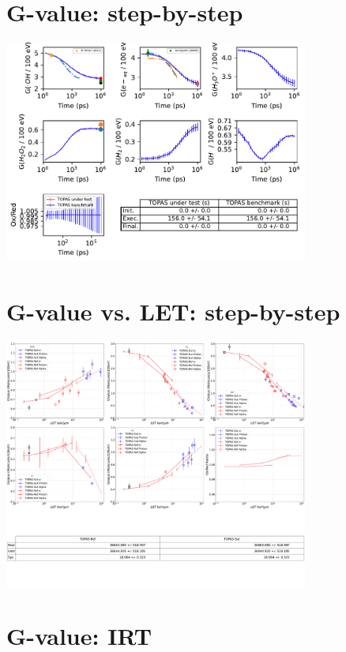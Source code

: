 \documentclass[aspectratio=1610]{beamer}
\begin{document}
\section{G-value: step-by-step}

\begin{frame}{\secname}
 \centering
   \includegraphics[width=0.75\textwidth]{./GvalueStepByStep/Gvalue}
\end{frame}

\section{G-value vs. LET: step-by-step}

\begin{frame}{\secname}
 \centering
   \includegraphics[width=0.75\textwidth]{./Gvalue_LET-SBS/Gvalue_LET-SBS}
\end{frame}

\section{G-value: IRT}
\end{document}
